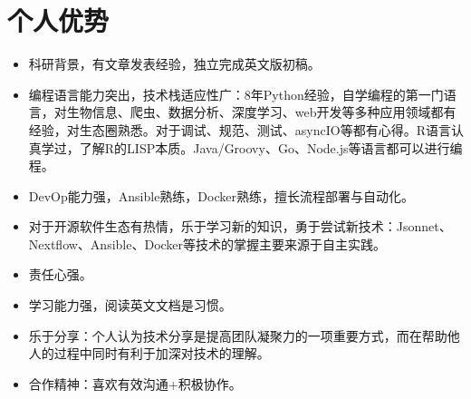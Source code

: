 \documentclass{resume}
\begin{document}
\section{个人优势}
\begin{itemize}[parsep=0.2ex]
  \item 科研背景，有文章发表经验，独立完成英文版初稿\cite{Zhao2015}。
  \item 编程语言能力突出，技术栈适应性广：8年Python经验，自学编程的第一门语言，对生物信息、爬虫、数据分析、深度学习、web开发等多种应用领域都有经验，对生态圈熟悉。对于调试、规范、测试、asyncIO等都有心得。R语言认真学过，了解R的LISP本质。Java/Groovy、Go、Node.js等语言都可以进行编程。
  \item DevOp能力强，Ansible熟练，Docker熟练，擅长流程部署与自动化。
  \item 对于开源软件生态有热情，乐于学习新的知识，勇于尝试新技术：Jsonnet、Nextflow、Ansible、Docker等技术的掌握主要来源于自主实践。
  \item 责任心强。
  \item 学习能力强，阅读英文文档是习惯。
  \item 乐于分享：个人认为技术分享是提高团队凝聚力的一项重要方式，而在帮助他人的过程中同时有利于加深对技术的理解。
  \item 合作精神：喜欢有效沟通+积极协作。

\end{itemize}
\end{document}

